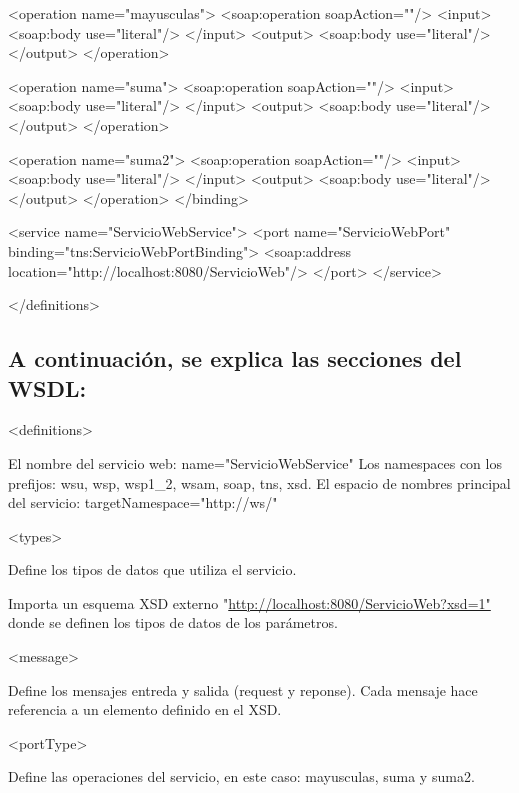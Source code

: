 \begin{SourceCode}
<operation name="mayusculas">
    <soap:operation soapAction=""/>
    <input>
        <soap:body use="literal"/>
    </input>
    <output>
        <soap:body use="literal"/>
    </output>
</operation>

<operation name="suma">
    <soap:operation soapAction=""/>
    <input>
        <soap:body use="literal"/>
    </input>
    <output>
        <soap:body use="literal"/>
    </output>
</operation>

<operation name="suma2">
    <soap:operation soapAction=""/>
    <input>
        <soap:body use="literal"/>
    </input>
    <output>
        <soap:body use="literal"/>
    </output>
</operation>
</binding>

<service name="ServicioWebService">
<port name="ServicioWebPort" binding="tns:ServicioWebPortBinding">
    <soap:address location="http://localhost:8080/ServicioWeb"/>
</port>
</service>

</definitions>
\end{SourceCode}

\subsection{A continuación, se explica las secciones del WSDL:}

\begin{SourceCode}
<definitions>

El nombre del servicio web: name="ServicioWebService"
Los namespaces con los prefijos: wsu, wsp, wsp1_2, wsam, soap, tns, xsd.
El espacio de nombres principal del servicio: targetNamespace="http://ws/"
\end{SourceCode}

\begin{SourceCode}
<types>

Define los tipos de datos que utiliza el servicio.
\end{SourceCode}

Importa un esquema XSD externo "\url{http://localhost:8080/ServicioWeb?xsd=1"} donde se definen los tipos de datos de los parámetros.

\begin{SourceCode}
<message>
\end{SourceCode}

Define los mensajes entreda y salida (request y reponse). Cada mensaje hace referencia a un elemento definido en el XSD.

\begin{SourceCode}
<portType>

Define las operaciones del servicio, en este caso: mayusculas, suma y suma2.
\end{SourceCode}

